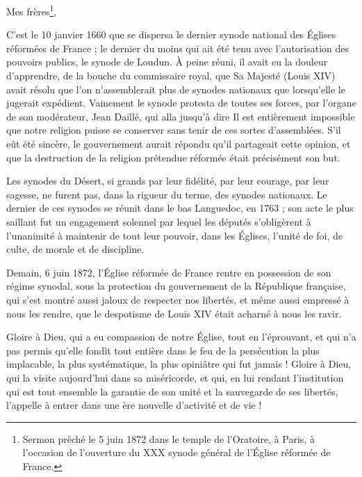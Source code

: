 
Mes frères\footnote{Sermon prêché le 5 juin 1872 dans le temple de l’Oratoire, à Paris, à l’occasion de l'ouverture du XXX synode général de l'Église réformée de France.},

C’est le 10 janvier 1660 que se dispersa le dernier synode national des Églises réformées de France ; le dernier du moins qui ait été tenu avec l’autorisation des pouvoirs publics, le synode de Loudun. À peine réuni, il avait eu la douleur d’apprendre, de la bouche du commissaire royal, que Sa Majesté (Louis XIV) avait résolu \Og{} que l’on n’assemblerait plus de synodes nationaux que lorsqu’elle le jugerait expédient\Fg{}. Vainement le synode protesta de toutes ses forces, par l’organe de son modérateur, Jean Daillé, qui alla jusqu’à dire\frcolon{} \Og{} Il est entièrement impossible que notre religion puisse se conserver sans tenir de ces sortes d’assemblées.\Fg{} S’il eût été sincère, le gouvernement aurait répondu qu’il partageait cette opinion, et que la destruction de la religion \Og{} prétendue réformée\Fg{} était précisément son but.

Les synodes du Désert, si grands par leur fidélité, par leur courage, par leur sagesse, ne furent pas, dans la rigueur du terme, des synodes nationaux. Le dernier de ces synodes se réunit dans le bas Languedoc, en 1763 ; son acte le plus saillant fut un engagement solennel par lequel les députés s’obligèrent à l’unanimité à maintenir de tout leur pouvoir, dans les Églises, l’unité de foi, de culte, de morale et de discipline.

Demain, 6 juin 1872, l’Église réformée de France rentre en possession de son régime synodal, sous la protection du gouvernement de la République française, qui s’est montré aussi jaloux de respecter nos libertés, et même aussi empressé à nous les rendre, que le despotisme de Louis XIV était acharné à nous les ravir.

Gloire à Dieu, qui a eu compassion de notre Église, tout en l’éprouvant, et qui n’a pas permis qu’elle fondît tout entière dans le feu de la persécution la plus implacable, la plus systématique, la plus opiniâtre qui fut jamais ! Gloire à Dieu, qui la visite aujourd’hui dans sa miséricorde, et qui, en lui rendant l’institution qui est tout ensemble la garantie de son unité et la sauvegarde de ses libertés, l’appelle à entrer dans une ère nouvelle d’activité et de vie !

